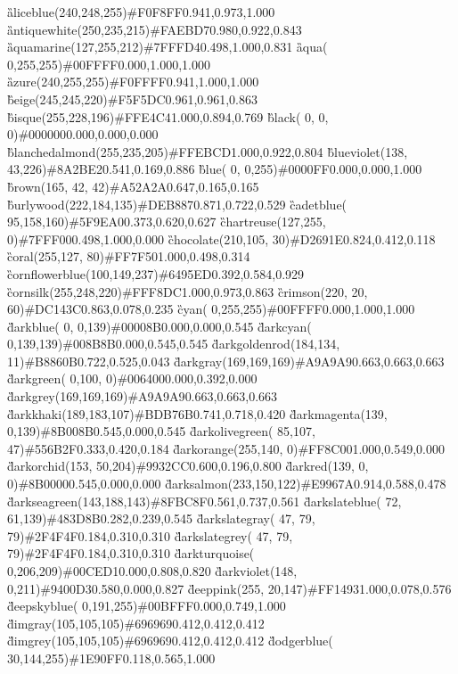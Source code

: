 \G{aliceblue}{(240,248,255)}{\#F0F8FF}{0.941,0.973,1.000}
\G{antiquewhite}{(250,235,215)}{\#FAEBD7}{0.980,0.922,0.843}
\G{aquamarine}{(127,255,212)}{\#7FFFD4}{0.498,1.000,0.831}
\G{aqua}{(  0,255,255)}{\#00FFFF}{0.000,1.000,1.000}
\G{azure}{(240,255,255)}{\#F0FFFF}{0.941,1.000,1.000}
\G{beige}{(245,245,220)}{\#F5F5DC}{0.961,0.961,0.863}
\G{bisque}{(255,228,196)}{\#FFE4C4}{1.000,0.894,0.769}
\G{black}{(  0,  0,  0)}{\#000000}{0.000,0.000,0.000}
\G{blanchedalmond}{(255,235,205)}{\#FFEBCD}{1.000,0.922,0.804}
\G{blueviolet}{(138, 43,226)}{\#8A2BE2}{0.541,0.169,0.886}
\G{blue}{(  0,  0,255)}{\#0000FF}{0.000,0.000,1.000}
\G{brown}{(165, 42, 42)}{\#A52A2A}{0.647,0.165,0.165}
\G{burlywood}{(222,184,135)}{\#DEB887}{0.871,0.722,0.529}
\G{cadetblue}{( 95,158,160)}{\#5F9EA0}{0.373,0.620,0.627}
\G{chartreuse}{(127,255,  0)}{\#7FFF00}{0.498,1.000,0.000}
\G{chocolate}{(210,105, 30)}{\#D2691E}{0.824,0.412,0.118}
\G{coral}{(255,127, 80)}{\#FF7F50}{1.000,0.498,0.314}
\G{cornflowerblue}{(100,149,237)}{\#6495ED}{0.392,0.584,0.929}
\G{cornsilk}{(255,248,220)}{\#FFF8DC}{1.000,0.973,0.863}
\G{crimson}{(220, 20, 60)}{\#DC143C}{0.863,0.078,0.235}
\G{cyan}{(  0,255,255)}{\#00FFFF}{0.000,1.000,1.000}
\G{darkblue}{(  0,  0,139)}{\#00008B}{0.000,0.000,0.545}
\G{darkcyan}{(  0,139,139)}{\#008B8B}{0.000,0.545,0.545}
\G{darkgoldenrod}{(184,134, 11)}{\#B8860B}{0.722,0.525,0.043}
\G{darkgray}{(169,169,169)}{\#A9A9A9}{0.663,0.663,0.663}
\G{darkgreen}{(  0,100,  0)}{\#006400}{0.000,0.392,0.000}
\G{darkgrey}{(169,169,169)}{\#A9A9A9}{0.663,0.663,0.663}
\G{darkkhaki}{(189,183,107)}{\#BDB76B}{0.741,0.718,0.420}
\G{darkmagenta}{(139,  0,139)}{\#8B008B}{0.545,0.000,0.545}
\G{darkolivegreen}{( 85,107, 47)}{\#556B2F}{0.333,0.420,0.184}
\G{darkorange}{(255,140,  0)}{\#FF8C00}{1.000,0.549,0.000}
\G{darkorchid}{(153, 50,204)}{\#9932CC}{0.600,0.196,0.800}
\G{darkred}{(139,  0,  0)}{\#8B0000}{0.545,0.000,0.000}
\G{darksalmon}{(233,150,122)}{\#E9967A}{0.914,0.588,0.478}
\G{darkseagreen}{(143,188,143)}{\#8FBC8F}{0.561,0.737,0.561}
\G{darkslateblue}{( 72, 61,139)}{\#483D8B}{0.282,0.239,0.545}
\G{darkslategray}{( 47, 79, 79)}{\#2F4F4F}{0.184,0.310,0.310}
\G{darkslategrey}{( 47, 79, 79)}{\#2F4F4F}{0.184,0.310,0.310}
\G{darkturquoise}{(  0,206,209)}{\#00CED1}{0.000,0.808,0.820}
\G{darkviolet}{(148,  0,211)}{\#9400D3}{0.580,0.000,0.827}
\G{deeppink}{(255, 20,147)}{\#FF1493}{1.000,0.078,0.576}
\G{deepskyblue}{(  0,191,255)}{\#00BFFF}{0.000,0.749,1.000}
\G{dimgray}{(105,105,105)}{\#696969}{0.412,0.412,0.412}
\G{dimgrey}{(105,105,105)}{\#696969}{0.412,0.412,0.412}
\G{dodgerblue}{( 30,144,255)}{\#1E90FF}{0.118,0.565,1.000}
